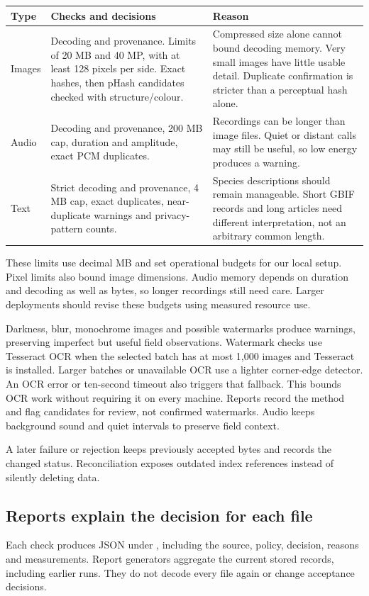 \documentclass[10pt,a4paper]{article}
\begin{document}
\begin{tabularx}{\linewidth}{@{}p{.14\linewidth}Y Y@{}}\toprule
Type & Checks and decisions & Reason\\\midrule
Images & Decoding and provenance. Limits of 20 MB and 40 MP, with at least 128 pixels per side. Exact hashes, then pHash candidates checked with structure/colour. & Compressed size alone cannot bound decoding memory. Very small images have little usable detail. Duplicate confirmation is stricter than a perceptual hash alone.\\
Audio & Decoding and provenance, 200 MB cap, duration and amplitude, exact PCM duplicates. & Recordings can be longer than image files. Quiet or distant calls may still be useful, so low energy produces a warning.\\
Text & Strict decoding and provenance, 4 MB cap, exact duplicates, near-duplicate warnings and privacy-pattern counts. & Species descriptions should remain manageable. Short GBIF records and long articles need different interpretation, not an arbitrary common length.\\\bottomrule
\end{tabularx}

These limits use decimal MB and set operational budgets for our local setup. Pixel limits also bound image dimensions. Audio memory depends on duration and decoding as well as bytes, so longer recordings still need care. Larger deployments should revise these budgets using measured resource use.

Darkness, blur, monochrome images and possible watermarks produce warnings, preserving imperfect but useful field observations. Watermark checks use Tesseract OCR when the selected batch has at most 1,000 images and Tesseract is installed. Larger batches or unavailable OCR use a lighter corner-edge detector. An OCR error or ten-second timeout also triggers that fallback. This bounds OCR work without requiring it on every machine. Reports record the method and flag candidates for review, not confirmed watermarks. Audio keeps background sound and quiet intervals to preserve field context.

A later failure or rejection keeps previously accepted bytes and records the changed status. Reconciliation exposes outdated index references instead of silently deleting data.

\subsection*{Reports explain the decision for each file}
Each check produces JSON under , including the source, policy, decision, reasons and measurements. Report generators aggregate the current stored records, including earlier runs. They do not decode every file again or change acceptance decisions.
\end{document}

